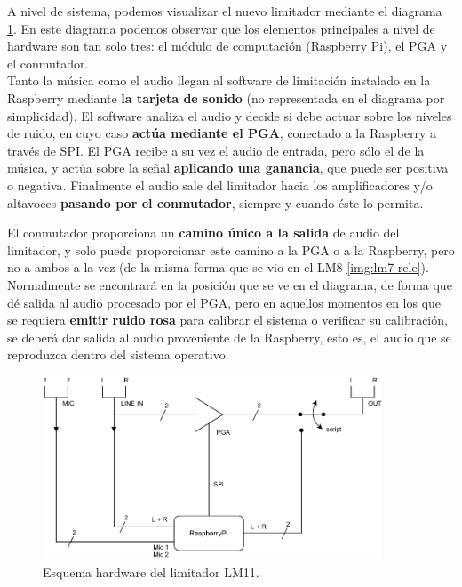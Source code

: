 A nivel de sistema, podemos visualizar el nuevo limitador mediante el diagrama \ref{fig:lms11-circuit}. En este diagrama podemos observar que los elementos principales a nivel de hardware son tan solo tres: el módulo de computación (Raspberry Pi), el \acrshort{PGA} y el conmutador. \\
Tanto la música como el audio llegan al software de limitación instalado en la Raspberry mediante \textbf{la tarjeta de sonido} (no representada en el diagrama por simplicidad). El software analiza el audio y decide si debe actuar sobre los niveles de ruido, en cuyo caso \textbf{actúa mediante el \acrshort{PGA}}, conectado a la Raspberry a través de \acrshort{SPI}. El \acrshort{PGA} recibe a su vez el audio de entrada, pero sólo el de la música, y actúa sobre la señal \textbf{aplicando una ganancia}, que puede ser positiva o negativa. Finalmente el audio sale del limitador hacia los amplificadores y/o altavoces \textbf{pasando por el conmutador}, siempre y cuando éste lo permita.

El conmutador proporciona un \textbf{camino único a la salida} de audio del limitador, y solo puede proporcionar este camino a la \acrshort{PGA} o a la Raspberry, pero no a ambos a la vez (de la misma forma que se vio en el LM8 \ref{img:lm7-rele}). Normalmente se encontrará en la posición que se ve en el diagrama, de forma que dé salida al audio procesado por el \acrshort{PGA}, pero en aquellos momentos en los que se requiera \textbf{emitir ruido rosa} para calibrar el sistema o verificar su calibración, se deberá dar salida al audio proveniente de la Raspberry, esto es, el audio que se reproduzca dentro del sistema operativo.

\begin{figure}[h]
    \centering
    \includegraphics[width=0.9\textwidth]{figuras/lms11-esquema-hardware.pdf}
    \caption{Esquema hardware del limitador \acrshort{LM11}.}
    \label{fig:lms11-circuit}
\end{figure}

